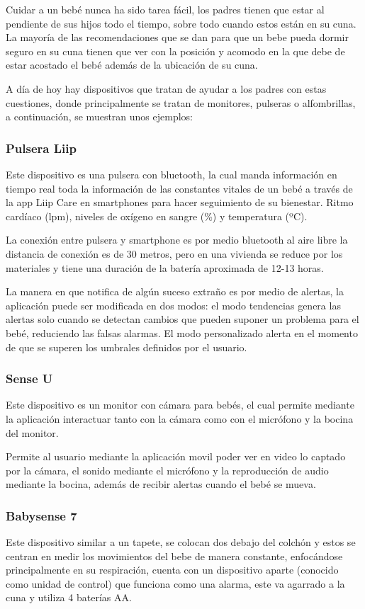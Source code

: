 Cuidar a un bebé nunca ha sido tarea fácil, los padres tienen que estar al pendiente de sus hijos todo el tiempo, sobre todo cuando estos están en su cuna. La mayoría de las recomendaciones que se dan para que un bebe pueda dormir seguro en su cuna tienen que ver con la posición y acomodo en la que debe de estar acostado el bebé además de la ubicación de su cuna.

A día de hoy hay dispositivos que tratan de ayudar a los padres con estas cuestiones, donde principalmente se tratan de monitores, pulseras o alfombrillas, a continuación, se muestran unos ejemplos:

\subsubsection{Pulsera Liip}
Este dispositivo es una pulsera con bluetooth, la cual manda información en tiempo real toda la información de las constantes vitales de un bebé a través de la app Liip Care en smartphones para hacer seguimiento de su bienestar. Ritmo cardíaco (lpm), niveles de oxígeno en sangre (\%) y temperatura (ºC).

La conexión entre pulsera y smartphone es por medio bluetooth al aire libre la distancia de conexión es de 30 metros, pero en una vivienda se reduce por los materiales y tiene una duración de la batería aproximada de 12-13 horas.

La manera en que notifica de algún suceso extraño es por medio de alertas, la aplicación puede ser modificada en dos modos: el modo tendencias genera las alertas solo cuando se detectan cambios que pueden suponer un problema para el bebé, reduciendo las falsas alarmas. El modo personalizado alerta en el momento de que se superen los umbrales definidos por el usuario.

\subsubsection{Sense U}
Este dispositivo es un monitor con cámara para bebés, el cual permite mediante la aplicación interactuar tanto con la cámara como con el micrófono y la bocina del monitor.

Permite al usuario mediante la aplicación movil poder ver en video lo captado por la cámara, el sonido mediante el micrófono y la reproducción de audio mediante la bocina, además de recibir alertas cuando el bebé se mueva.

\subsubsection{Babysense 7}
Este dispositivo similar a un tapete, se colocan dos debajo del colchón y estos se centran en medir los movimientos del bebe de manera constante, enfocándose principalmente en su respiración, cuenta con un dispositivo aparte (conocido como unidad de control) que funciona como una alarma, este va agarrado a la cuna y utiliza 4 baterías AA.

